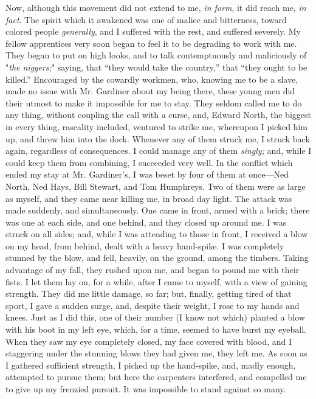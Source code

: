 Now, although this movement did not extend to me, \emph{in form}, it did
reach me, \emph{in fact}. The spirit which it awakened was one of malice
and bitterness, toward colored people \emph{generally}, and I suffered
with the rest, and suffered severely. My fellow apprentices very soon
began to feel it to be degrading to work with me. They began to put on
high looks, and to talk contemptuously and maliciously of "\emph{the
niggers;}" saying, that ``they would take the country,'' that ``they
ought to be killed.'' Encouraged by the cowardly workmen, who, knowing
me to be a slave, made no issue with Mr. Gardiner about my being there,
these young men did their utmost to make it impossible for me to stay.
They seldom called me to do any thing, without coupling the call with a
curse, and, Edward North, the biggest in every thing, rascality
{\protect\hypertarget{313}{}{}}included, ventured to strike me,
whereupon I picked him up, and threw him into the dock. Whenever any of
them struck me, I struck back again, regardless of consequences. I could
manage any of them \emph{singly;} and, while I could keep them from
combining, I succeeded very well. In the conflict which ended my stay at
Mr. Gardiner's, I was beset by four of them at once---Ned North, Ned
Hays, Bill Stewart, and Tom Humphreys. Two of them were as large as
myself, and they came near killing me, in broad day light. The attack
was made suddenly, and simultaneously. One came in front, armed with a
brick; there was one at each side, and one behind, and they closed up
around me. I was struck on all sides; and, while I was attending to
those in front, I received a blow on my head, from behind, dealt with a
heavy hand-spike. I was completely stunned by the blow, and fell,
heavily, on the ground, among the timbers. Taking advantage of my fall,
they rushed upon me, and began to pound me with their fists. I let them
lay on, for a while, after I came to myself, with a view of gaining
strength. They did me little damage, so far; but, finally, getting tired
of that sport, I gave a sudden surge, and, despite their weight, I rose
to my hands and knees. Just as I did this, one of their number (I know
not which) planted a blow with his boot in my left eye, which, for a
time, seemed to have burst my eyeball. When they saw my eye completely
closed, my face covered with blood, and I staggering under the stunning
blows they had given me, they left me. As soon as I gathered sufficient
strength, I picked up the hand-spike, and, madly enough,
{\protect\hypertarget{314}{}{}}attempted to pursue them; but here the
carpenters interfered, and compelled me to give up my frenzied pursuit.
It was impossible to stand against so many.

